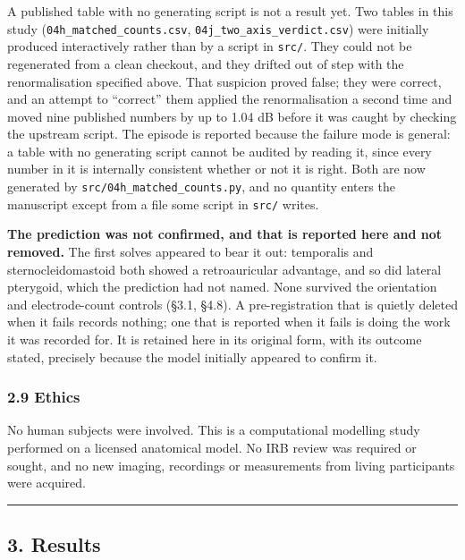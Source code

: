 \documentclass[
  11pt,
  a4paper,
]{article}
\begin{document}
A published table with no generating script is not a result yet. Two tables in
this study (\texttt{04h\_matched\_counts.csv}, \texttt{04j\_two\_axis\_verdict.csv}) were initially
produced interactively rather than by a script in \texttt{src/}. They could not be
regenerated from a clean checkout, and they drifted out of step with the
renormalisation specified above. That suspicion proved false; they were correct,
and an attempt to ``correct'' them applied the renormalisation a second time and
moved nine published numbers by up to 1.04 dB before it was caught by checking
the upstream script. The episode is reported because the failure mode is
general: a table with no generating script cannot be audited by reading it,
since every number in it is internally consistent whether or not it is right.
Both are now generated by \texttt{src/04h\_matched\_counts.py}, and no quantity enters
the manuscript except from a file some script in \texttt{src/} writes.

\textbf{The prediction was not confirmed, and that is reported here and not removed.}
The first solves appeared to bear it out: temporalis and sternocleidomastoid
both showed a retroauricular advantage, and so did lateral pterygoid, which the
prediction had not named. None survived the orientation and electrode-count
controls (\S{}3.1, \S{}4.8). A pre-registration that is quietly deleted when it fails
records nothing; one that is reported when it fails is doing the work it was
recorded for. It is retained here in its original form, with its outcome stated,
precisely because the model initially appeared to confirm it.

\subsubsection{2.9 Ethics}\label{ethics}

No human subjects were involved. This is a computational modelling study
performed on a licensed anatomical model. No IRB review was required or sought,
and no new imaging, recordings or measurements from living participants were
acquired.

\begin{center}\rule{0.5\linewidth}{0.5pt}\end{center}

\subsection{3. Results}\label{results}
\end{document}
